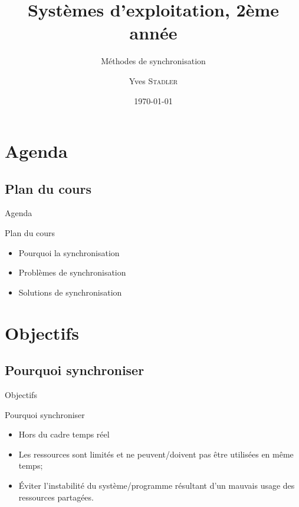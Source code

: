 \title{Systèmes d'exploitation, 2ème année}
\subtitle{Méthodes de synchronisation}

\author{Yves \textsc{Stadler}}

\date{\today}





\begin{frame}
\titlepage
\end{frame}

\def\sectitle{Agenda}
\section{\sectitle}
\def\subsectitle{Plan du cours}
\subsection{\subsectitle}

\begin{frame}{\sectitle}
    \begin{block}{\subsectitle}
        \begin{itemize}
            \item Pourquoi la synchronisation
            \item Problèmes de synchronisation
            \item Solutions de synchronisation
        \end{itemize}
    \end{block}
\end{frame}


\def\sectitle{Objectifs}
\section{\sectitle}
\def\subsectitle{Pourquoi synchroniser}
\subsection{\subsectitle}
\begin{frame}{\sectitle}
    \begin{block}{\subsectitle}
        \begin{itemize}
            \item Hors du cadre temps réel
            \item Les ressources sont limités et ne peuvent/doivent pas être
                utilisées en même temps;
            \item Éviter l'instabilité du système/programme résultant d'un
                mauvais usage des ressources partagées.
        \end{itemize}
    \end{block}
\end{frame}

